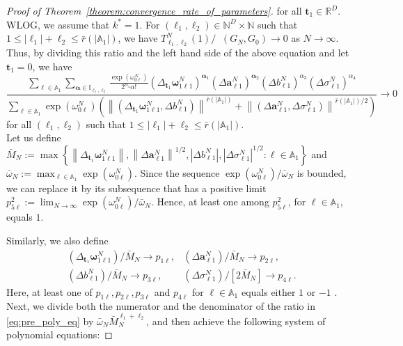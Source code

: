 \documentclass[twoside]{article}
\DeclareMathOperator*{\VD}{D_{V}}
\theoremstyle{plain}
\theoremstyle{definition}
\theoremstyle{plain}
\def\valpha{{\bm{\alpha}}}
\def\vomega{{\bm{\omega}}}
\def\vell{{\bm{\ell}}}
\def\va{{\bm{a}}}
\def\vt{{\bm{t}}}
\def\sA{{\mathbb{A}}}
\def\sI{{\mathbb{I}}}
\begin{document}
\begin{proof}[Proof of Theorem~\ref{theorem:convergence_rate_of_parameters}]
for all $\vt_{1} \in \mathbb{R}^{D}$. WLOG, we assume that $k^{*}=1$. For $\left(\vell_{1}, \ell_{2}\right) \in \mathbb{N}^{D} \times \mathbb{N}$ such that $1 \leq\left|\vell_{1}\right|+\ell_{2} \leq \bar{r}\left(\left|\sA_{1}\right|\right)$, we have $T_{\vell_{1}, \ell_{2}}^{N}(1) / \VD (G_N, G_0) \to 0$ as $N \to \infty$. Thus, by dividing this ratio and the left hand side of the above equation and let $\vt_{1}=0$, we have
\begin{equation}
\frac{\sum_{\ell \in \sA_{1}} \sum_{\valpha \in \sI_{\vell_{1}, \ell_{2}}} \frac{\exp \left(\omega_{0 \ell}^{N}\right)}{2^{\alpha_{4}} \alpha!}\left(\Delta_{\vt_{1}} \vomega_{1 \ell 1}^{N}\right)^{\valpha_{1}}\left(\Delta \va_{\ell 1}^{N}\right)^{\valpha_{2}}\left(\Delta b_{\ell 1}^{N}\right)^{\alpha_{3}}\left(\Delta \sigma_{\ell 1}^{N}\right)^{\alpha_{4}}}{\sum_{\ell \in \sA_{1}} \exp \left(\omega_{0 \ell}^{N}\right)\left(\left\|\left(\Delta_{\vt_{1}} \vomega_{1 \ell 1}^{N}, \Delta b_{\ell 1}^{N}\right)\right\|^{\bar{r}\left(\left|\sA_{1}\right|\right)}+\left\|\left(\Delta \va_{\ell 1}^{N}, \Delta \sigma_{\ell 1}^{N}\right)\right\|^{\bar{r}\left(\left|\sA_{1}\right|\right) / 2}\right)} \to 0 \label{eq:pre_poly_eq}
\end{equation}
for all $\left(\vell_{1}, \ell_{2}\right)$ such that $1 \leq\left|\vell_{1}\right|+\ell_{2} \leq \bar{r}\left(\left|\sA_{1}\right|\right)$.\\
Let us define $\bar{M}_{N}:=\max \left\{\left\|\Delta_{\vt_{1}} \vomega_{1 \ell 1}^{N}\right\|,\left\|\Delta \va_{\ell 1}^{N}\right\|^{1 / 2},\left|\Delta b_{\ell 1}^{N}\right|,\left|\Delta \sigma_{\ell 1}^{N}\right|^{1 / 2}: \ell \in \sA_{1}\right\}$ and $\bar{\omega}_{N}:= \max_{\ell \in \sA_{1}} \exp \left(\omega_{0 \ell}^{N}\right)$. Since the sequence $\exp \left(\omega_{0 \ell}^{N}\right) / \bar{\omega}_{N}$ is bounded, we can replace it by its subsequence that has a positive limit $p_{5 \ell}^{2}:=\lim _{N \to \infty} \exp \left(\omega_{0 \ell}^{N}\right) / \bar{\omega}_{N}$. Hence, at least one among $p_{5 \ell}^{2}$, for $\ell \in \sA_{1}$, equals $1$.

Similarly, we also define
\begin{align}
\left(\Delta_{\vt_{1}} \vomega_{1 \ell 1}^{N}\right) / \bar{M}_{N} \to p_{1 \ell}, & \left(\Delta \va_{\ell 1}^{N}\right) / \bar{M}_{N} \to p_{2 \ell}, \nonumber\\
\left(\Delta b_{\ell 1}^{N}\right) / \bar{M}_{N} \to p_{3 \ell}, & \left(\Delta \sigma_{\ell 1}^{N}\right) /\left[2 \bar{M}_{N}\right] \to p_{4 \ell}. \nonumber
\end{align}
Here, at least one of $p_{1 \ell}, p_{2 \ell}, p_{3 \ell}$ and $p_{4 \ell}$ for $\ell \in \sA_{1}$ equals either $1$ or $-1$ . Next, we divide both the numerator and the denominator of the ratio in \cref{eq:pre_poly_eq} by $\bar{\omega}_{N} \bar{M}_{N}^{\vell_{1}+\ell_{2}}$, and then achieve the following system of polynomial equations:


\end{proof}
\end{document}
